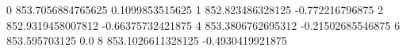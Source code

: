 0 853.7056884765625 0.1099853515625
1 852.823486328125 -0.772216796875
2 852.9319458007812 -0.66375732421875
4 853.3806762695312 -0.21502685546875
6 853.595703125 0.0
8 853.1026611328125 -0.4930419921875
